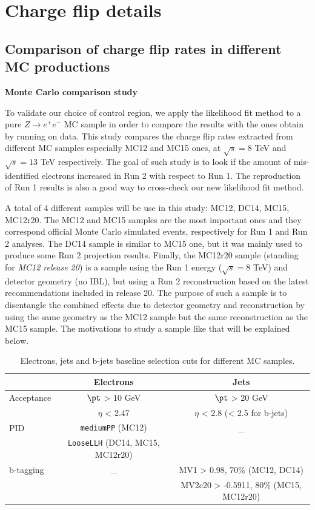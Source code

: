 \clearpage 
\section{Charge flip details}
\label{app:flips}
\subsection{Comparison of charge flip rates in different MC productions}

\par{\bf Monte Carlo comparison study}

To validate our choice of control region, we apply the likelihood fit method to a pure $Z \to e^+e^-$ MC sample in order to compare the results with the ones obtain by running on data. This study compares the charge flip rates extracted from different MC samples especially MC12 and MC15 ones, at $\sqrt{s}=8$ TeV and $\sqrt{s}=13$ TeV respectively. The goal of such study is to look if the amount of mis-identified electrons increased in Run 2 with respect to Run 1. The reproduction of Run 1 results is also a good way to cross-check our new likelihood fit method.

A total of 4 different samples will be use in this study: MC12, DC14, MC15, MC12r20. The MC12 and MC15 samples are the most important ones and they correspond official Monte Carlo simulated events, respectively for Run 1 and Run 2 analyses. The DC14 sample is similar to MC15 one, but it was mainly used to produce some Run 2 projection results. Finally, the MC12r20 sample (standing for \textit{MC12 release 20}) is a sample using the Run 1 energy ($\sqrt{s}=8$ TeV) and detector geometry (no IBL), but using a Run 2 reconstruction based on the latest recommendations included in release 20. The purpose of such a sample is to disentangle the combined effects due to detector geometry and reconstruction by using the same geometry as the MC12 sample but the same reconstruction as the MC15 sample. The motivations to study a sample like that will be explained below.

\begin{table}[!htb]
\centering
\begin{tabular}{|l|c|c|}
\hline
 & Electrons & Jets \\
\hline \hline
Acceptance & $\pt$ > 10 GeV & $\pt$ > 20 GeV \\
		   & $\eta$ < 2.47 & $\eta$ < 2.8 (< 2.5 for b-jets) \\ 
\hline
PID 		   & \texttt{mediumPP} \small (MC12) & \_ \\
  		   & \texttt{LooseLLH} \small (DC14, MC15, MC12r20) &  \\
\hline
b-tagging	   & \_ & \small MV1 > 0.98, 70\% (MC12, DC14) \\
           	   &  & \small MV2c20 > -0.5911, 80\% (MC15, MC12r20) \\
\hline
\end{tabular}
\caption{\label{tab:baseline} Electrons, jets and b-jets baseline selection cuts for different MC samples.}
\end{table}


